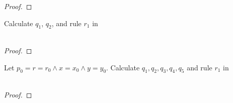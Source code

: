 \documentclass[12pt]{article}
\newenvironment{exercise}[2][Exercise]{\begin{trivlist}
\item[\hskip \labelsep {\bfseries #1}\hskip \labelsep {\bfseries #2.}]}{\end{trivlist}}
\begin{document}
\begin{proof}

\end{proof}

\begin{exercise}{5}
Calculate $q_{1}$, $q_{2}$, and rule $r_{1}$ in \\ \\
\end{exercise}

\begin{proof}

\end{proof}


\begin{exercise}{6}
Let $p_{0} = r = r_{0} \land x = x_{0} \land y = y_{0}$. Calculate $q_{1}, q_{2}, q_{3}, q_{4}, q_{5}$ and rule $r_{1}$ in \\ \\
\end{exercise}

\begin{proof}

\end{proof}
\end{document}
